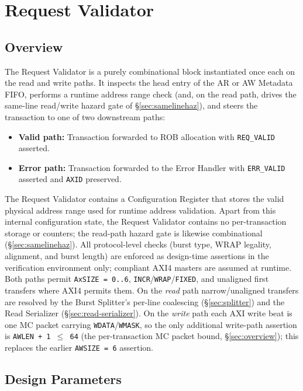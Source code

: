 \section{Request Validator}
\subsection{Overview}

The Request Validator is a purely combinational block instantiated once
each on the read and write paths. It inspects the head entry of the AR or AW
Metadata FIFO, performs a runtime address range check (and, on the read
path, drives the same-line read/write hazard gate of
\S\ref{sec:samelinehaz}), and steers the transaction to one of two
downstream paths:

\begin{itemize}
  \item \textbf{Valid path:} Transaction forwarded to ROB allocation
        with \texttt{REQ\_VALID} asserted.
  \item \textbf{Error path:} Transaction forwarded to the Error Handler
        with \texttt{ERR\_VALID} asserted and \texttt{AXID} preserved.
\end{itemize}

The Request Validator contains a Configuration Register that stores the valid physical address range used for runtime address validation. 
Apart from this internal configuration state, the Request Validator contains no per-transaction storage or counters; the read-path hazard gate is likewise combinational (\S\ref{sec:samelinehaz}).
All protocol-level checks (burst type, WRAP legality, alignment, and burst
length) are enforced as design-time assertions in the verification
environment only; compliant AXI4 masters are assumed at runtime. Both paths
permit \texttt{AxSIZE = 0..6}, \texttt{INCR}/\texttt{WRAP}/\texttt{FIXED}, and
unaligned first transfers where AXI4 permits them. On the \emph{read} path
narrow/unaligned transfers are resolved by the Burst Splitter's per-line
coalescing (\S\ref{sec:splitter}) and the Read Serializer
(\S\ref{sec:read-serializer}). On the \emph{write} path each AXI write beat is
one MC packet carrying \texttt{WDATA}/\texttt{WMASK}, so the only additional
write-path assertion is \texttt{AWLEN + 1 $\le$ 64} (the per-transaction MC
packet bound, \S\ref{sec:overview}); this replaces the earlier
\texttt{AWSIZE = 6} assertion.

\subsection{Design Parameters}

